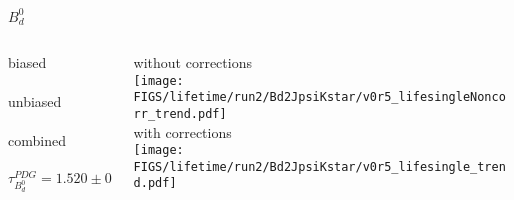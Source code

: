 \begin{frame}{$B_d^0$}
  
  \begin{columns}
  
  \begin{column}{0.45\textwidth}
  {\color{scqorange}biased} \\[2mm]
  \resizebox{\textwidth}{!}{}\\[5mm]
  {\color{scqred}unbiased} \\[2mm]
  \resizebox{\textwidth}{!}{}\\[5mm]
  {\color{scqgreen}combined} \\[2mm]
  \resizebox{\textwidth}{!}{}\\
  \begin{equation*}
    \tau_{B_d^0}^{PDG} = 1.520 \pm 0.004
  \end{equation*}
  \end{column}

  \begin{column}{0.45\textwidth}
  \footnotesize
  {without corrections} \\[2mm]
  \texttt{[image: \\FIGS/lifetime/run2/Bd2JpsiKstar/v0r5\_lifesingleNoncorr\_trend.pdf]}\\[3mm]
  {with corrections} \\[2mm]
  \texttt{[image: \\FIGS/lifetime/run2/Bd2JpsiKstar/v0r5\_lifesingle\_trend.pdf]}
  \end{column}
  
  \end{columns}

\end{frame}



